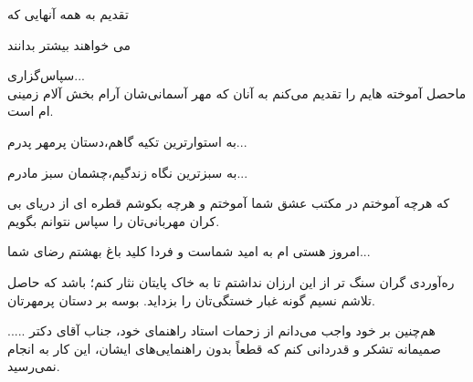\newpage
\vspace{4cm}

{\nastaliq
	{\Huge
		تقدیم به همه آنهایی که 
		\vspace{1.5cm}
		
		\hspace{3cm}
		می خواهند بیشتر بدانند
}}


\newpage
{\nastaliq\LARGE
سپاس‌گزاری...
}
\\[2cm]
 ماحصل آموخته هایم را تقدیم می‌کنم به آنان که مهر آسمانی‌شان آرام بخش آلام زمینی ام است.
 
به استوارترین تکیه گاهم،دستان پرمهر پدرم...

به سبزترین نگاه زندگیم،چشمان سبز مادرم...

که هرچه آموختم در مکتب عشق شما آموختم و هرچه بکوشم قطره ای از دریای بی کران مهربانی‌تان را سپاس نتوانم بگویم.

امروز هستی ام به امید شماست و فردا کلید باغ بهشتم رضای شما...

ره‌آوردی گران سنگ تر از این ارزان نداشتم تا به خاک پایتان نثار کنم؛ باشد که حاصل تلاشم نسیم گونه غبار خستگی‌تان را بزداید. بوسه بر دستان پرمهرتان.

هم‌چنین بر خود واجب می‌دانم از زحمات استاد راهنمای خود، جناب آقای دکتر ..... صمیمانه تشکر و  قدردانی کنم  که قطعاً بدون راهنمایی‌های‌ ایشان، این کار به انجام نمی‌رسید. 
